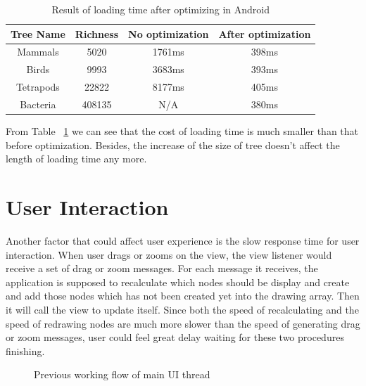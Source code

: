 \documentclass[MSc]{icldt}
\begin{document}
\begin{table} [H]
	\centering %
	\begin{tabular}{|c c c c|} %
		\hline %
		Tree Name & Richness  & No optimization  & After optimization \\%
		\hline  %
		Mammals & 5020 & 1761ms & 398ms   \\  %
		\hline
		Birds & 9993 & 3683ms & 393ms  \\
		\hline
		Tetrapods & 22822 & 8177ms & 405ms   \\ 
		\hline %
		Bacteria & 408135 & N/A & 380ms  \\ [1ex] %
		\hline
	\end{tabular}
	\label{table:loadingCamparison} %
	\caption{Result of loading time after optimizing in Android} %
\end{table}

From Table ~\ref{table:loadingCamparison} we can see that the cost of loading time is much smaller than that before optimization. Besides, the increase of the size of tree doesn't affect the length of loading time any more.

\section{User Interaction}

Another factor that could affect user experience is the slow response time for user interaction. 
When user drags or zooms on the view, the view listener would receive a set of drag or zoom messages. For each message it receives, the application is supposed to recalculate which nodes should be display and create and add those nodes which has not been created yet into the drawing array. Then it will call the view to update itself. Since both the speed of recalculating and the speed of redrawing nodes are much more slower than the speed of generating drag or zoom messages, user could feel great delay waiting for these two procedures finishing.


\begin{figure}[H]
\caption{Previous working flow of main UI thread}
\end{figure}
\end{document}

